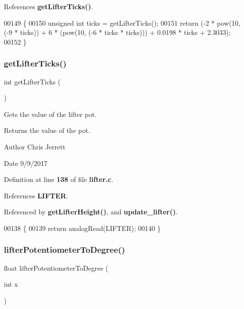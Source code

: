 References \textbf{ get\+Lifter\+Ticks()}.


\begin{DoxyCode}
00149                          \{
00150   \textcolor{keywordtype}{unsigned} \textcolor{keywordtype}{int} ticks = getLifterTicks();
00151   \textcolor{keywordflow}{return} (-2 * pow(10, (-9 * ticks)) + 6 * (pow(10, (-6 * ticks * ticks))) + 0.0198 * ticks + 2.3033);
00152 \}
\end{DoxyCode}
\mbox{\label{lifter_8h_acdf909159b0406c48099843f2306be78}} 
\subsubsection{get\+Lifter\+Ticks()}
{\footnotesize\ttfamily int get\+Lifter\+Ticks (\begin{DoxyParamCaption}{ }\end{DoxyParamCaption})}



Gets the value of the lifter pot. 

\begin{DoxyReturn}{Returns}
the value of the pot. 
\end{DoxyReturn}
\begin{DoxyAuthor}{Author}
Chris Jerrett 
\end{DoxyAuthor}
\begin{DoxyDate}{Date}
9/9/2017 
\end{DoxyDate}


Definition at line \textbf{ 138} of file \textbf{ lifter.\+c}.



References \textbf{ L\+I\+F\+T\+ER}.



Referenced by \textbf{ get\+Lifter\+Height()}, and \textbf{ update\+\_\+lifter()}.


\begin{DoxyCode}
00138                      \{
00139   \textcolor{keywordflow}{return} analogRead(LIFTER);
00140 \}
\end{DoxyCode}
\mbox{\label{lifter_8h_ab0460888f3213e5510bd25ae1e152a75}} 
\subsubsection{lifter\+Potentiometer\+To\+Degree()}
{\footnotesize\ttfamily float lifter\+Potentiometer\+To\+Degree (\begin{DoxyParamCaption}\item[{int}]{x }\end{DoxyParamCaption})}



